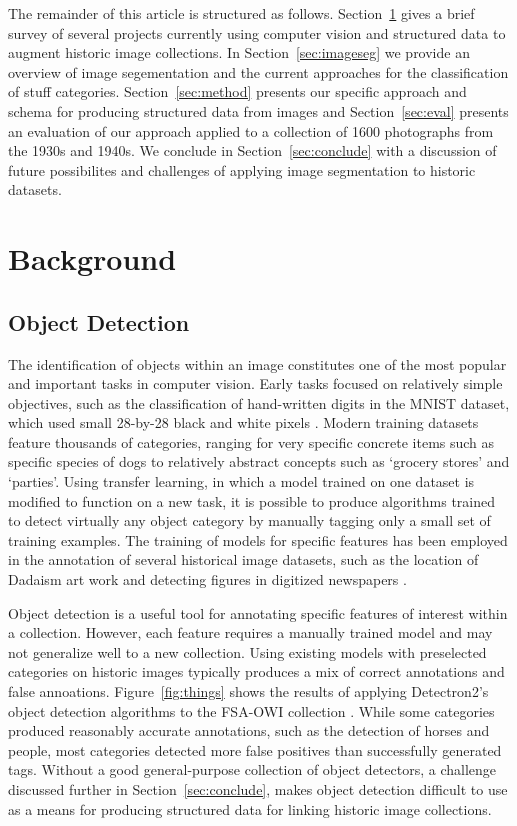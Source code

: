 \documentclass[10pt, a4paper]{article}
\begin{document}
The remainder of this article is structured as follows.
Section~\ref{sec:background} gives a brief survey of several projects currently
using computer vision and structured data to augment historic image collections.
In Section~\ref{sec:imageseg} we provide an overview of image segementation and
the current approaches for the classification of stuff categories.
Section~\ref{sec:method} presents our specific approach and schema for
producing structured data from images and Section~\ref{sec:eval} presents an
evaluation of our approach applied to a collection of 1600 photographs from the
1930s and 1940s. We conclude in Section~\ref{sec:conclude} with a discussion of
future possibilites and challenges of applying image segmentation to historic
datasets.


\section{Background} \label{sec:background}

\subsection{Object Detection}

The identification of objects within an image constitutes one of the most
popular and important tasks in computer vision. Early tasks focused on
relatively simple objectives, such as the classification of hand-written
digits in the MNIST dataset, which used small 28-by-28 black and white pixels
\cite{platt1999using}. Modern training datasets feature thousands of categories,
ranging for very specific concrete items such as specific species of dogs to
relatively abstract concepts such as `grocery stores' and `parties'. Using
transfer learning, in which a model trained on one dataset is modified to
function on a new task, it is possible to produce algorithms trained to detect
virtually any object category by manually tagging only a small set of training
examples. The training of models for specific features has been employed in
the annotation of several historical image datasets, such as the location of
Dadaism art work \cite{thompson2017computational} and detecting figures in
digitized newspapers \cite{wevers2019visual}.

Object detection is a useful tool for annotating specific features of interest
within a collection. However, each feature requires a manually trained model
and may not generalize well to a new collection. Using existing models with
preselected categories on historic images typically produces a mix of
correct annotations and false annoations. Figure~\ref{fig:things} shows the results
of applying Detectron2's object detection algorithms to the FSA-OWI collection
\cite{wu2019detectron2}. While some categories produced reasonably accurate
annotations, such as the detection of horses and people, most categories detected
more false positives than successfully generated tags. Without a good general-purpose
collection of object detectors, a challenge discussed further in
Section~\ref{sec:conclude}, makes object detection difficult to use as a means
for producing structured data for linking historic image collections.
\end{document}
